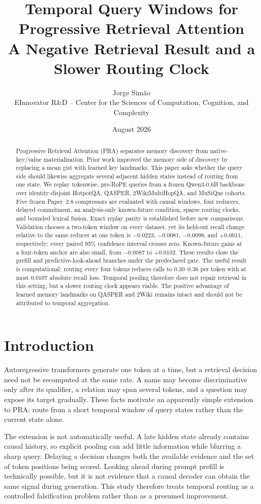 \documentclass[11pt]{article}
\title{Temporal Query Windows for Progressive Retrieval Attention\\
\large A Negative Retrieval Result and a Slower Routing Clock}
\author{Jorge Sim\~ao\\EInnovator R\&D -- Center for the Sciences of Computation, Cognition, and Complexity}
\date{August 2026}
\newcommand{\pra}{\textsc{PRA}}
\begin{document}
\maketitle

\begin{abstract}
Progressive Retrieval Attention (\pra) separates memory discovery from native-key/value materialization. Prior work improved the memory side of discovery by replacing a mean gist with learned key landmarks. This paper asks whether the query side should likewise aggregate several adjacent hidden states instead of routing from one state. We replay tokenwise, pre-RoPE queries from a frozen Qwen3-0.6B backbone over identity-disjoint HotpotQA, QASPER, 2WikiMultiHopQA, and MuSiQue cohorts. Five frozen Paper~2.8 compressors are evaluated with causal windows, four reducers, delayed commitment, an analysis-only known-future condition, sparse routing clocks, and bounded lexical fusion. Exact replay parity is established before new comparisons. Validation chooses a two-token window on every dataset, yet its held-out recall change relative to the same reducer at one token is $-0.0223$, $-0.0081$, $-0.0098$, and $+0.0011$, respectively; every paired 95\% confidence interval crosses zero. Known-future gains at a four-token anchor are also small, from $-0.0087$ to $+0.0102$. These results close the prefill and predictive-look-ahead branches under the predeclared gate. The useful result is computational: routing every four tokens reduces calls to $0.30$--$0.36$ per token with at most $0.0107$ absolute recall loss. Temporal pooling therefore does not repair retrieval in this setting, but a slower routing clock appears viable. The positive advantage of learned memory landmarks on QASPER and 2Wiki remains intact and should not be attributed to temporal aggregation.
\end{abstract}

\section{Introduction}
Autoregressive transformers generate one token at a time, but a retrieval decision need not be recomputed at the same rate. A name may become discriminative only after its qualifier, a relation may span several tokens, and a question may expose its target gradually. These facts motivate an apparently simple extension to \pra: route from a short temporal window of query states rather than the current state alone.

The extension is not automatically useful. A late hidden state already contains causal history, so explicit pooling can add little information while blurring a sharp query. Delaying a decision changes both the available evidence and the set of token positions being scored. Looking ahead during prompt prefill is technically possible, but it is not evidence that a causal decoder can obtain the same signal during generation. This study therefore treats temporal routing as a controlled falsification problem rather than as a presumed improvement.
\end{document}
